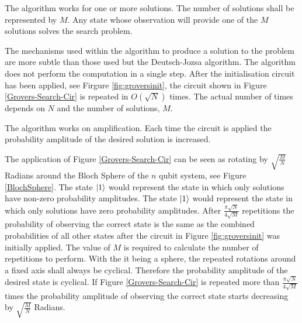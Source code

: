 The algorithm works for one or more solutions.
The number of solutions shall be represented by $M$.
Any state whose observation will provide one of the $M$ solutions solves the search problem.

The mechanisms used within the algorithm to produce a solution to the problem are more subtle than those used but the Deutsch-Jozsa algorithm.
The algorithm does not perform the computation in a single step.
After the initialisation circuit has been applied, see Firgure \ref{fig:groversinit}, the circuit shown in Figure \ref{Grovers-Search-Cir} is repeated in $O(\sqrt{N})$ times.
The actual number of times depends on $N$ and the number of solutions, $M$.

The algorithm works on amplification.
Each time the circuit is applied the probability amplitude of the desired solution is increased.

The application of Figure \ref{Grovers-Search-Cir} can be seen as rotating by $\sqrt{\frac{M}{N}}$ Radians around the Bloch Sphere of the $n$ qubit system, see Figure \ref{BlochSphere}.
The state $\left\vert{1}\right\rangle$ would represent the state in which only solutions have non-zero probability amplitudes.
The state $\left\vert{1}\right\rangle$ would represent the state in which only solutions have zero probability amplitudes.
After $\frac{\pi\sqrt{N}}{4\sqrt{M}}$ repetitions the probability of observing the correct state is the same as the combined probabilities of all other states after the circuit in Figure \ref{fig:groversinit} was initially applied.
The value of $M$ is required to calculate the number of repetitions to perform.
With the it being a sphere, the repeated rotations around a fixed axis shall always be cyclical.
Therefore the probability amplitude of the desired state is cyclical.
If Figure \ref{Grovers-Search-Cir} is repeated more than $\frac{\pi\sqrt{N}}{4\sqrt{M}}$ times the probability amplitude of observing the correct state starts decreasing by $\sqrt{\frac{M}{N}}$ Radians.

